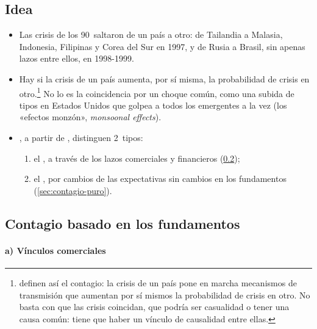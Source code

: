 \documentclass[11pt]{article}
\begin{document}
\subsection{Idea}\label{sec:contagio-idea}

\begin{itemize}
\item Las crisis de los 90~saltaron de un país a otro: de Tailandia a Malasia, Indonesia, Filipinas y Corea del Sur en 1997, y de Rusia a Brasil, sin apenas lazos entre ellos, en 1998-1999\nocite{LaevenValencia2020}.
\item Hay  si la crisis de un país aumenta, por sí misma, la probabilidad de crisis en otro.\footnote{\textcite{ERW1996Contagious} definen así el contagio: la crisis de un país pone en marcha mecanismos de transmisión que aumentan por sí mismos la probabilidad de crisis en otro. No basta con que las crisis coincidan, que podría ser casualidad o tener una causa común: tiene que haber un vínculo de causalidad entre ellas.} No lo es la coincidencia por un choque común, como una subida de tipos en Estados Unidos que golpea a todos los emergentes a la vez (los «efectos monzón», \emph{monsoonal effects})\nocite{Masson1998Contagion}.
\item \textcite{KaminskyReinhart2000Contagion}, a partir de \textcite{CalvoReinhart1996Contagion}, distinguen 2~tipos:
  \begin{enumerate}
  \item el , a través de los lazos comerciales y financieros (\ref{sec:contagio-fundamentos});
  \item el , por cambios de las expectativas sin cambios en los fundamentos (\ref{sec:contagio-puro}).
  \end{enumerate}
\end{itemize}

\subsection{Contagio basado en los fundamentos}\label{sec:contagio-fundamentos}

\paragraph{a) Vínculos comerciales}
\end{document}

